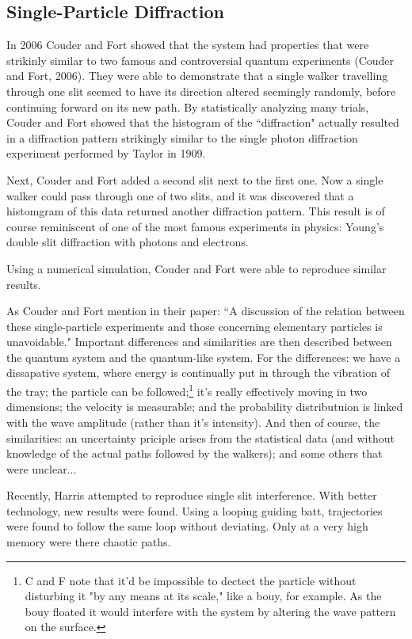              \subsection{Single-Particle Diffraction}
In 2006 Couder and Fort showed that the system had properties that were strikinly similar to two famous and controversial quantum experiments (Couder and Fort, 2006). They were able to demonstrate that a single walker travelling through one slit seemed to have its direction altered seemingly randomly, before continuing forward on its new path. By statistically analyzing many trials, Couder and Fort showed that the histogram of the ``diffraction" actually resulted in a diffraction pattern strikingly similar to the single photon diffraction experiment performed by Taylor in 1909. 

Next, Couder and Fort added a second slit next to the first one. Now a single walker could pass through  one of two slits, and it was discovered that a histomgram of this data returned another diffraction pattern. This result is of course reminiscent of one of the most famous experiments in physics: Young's double slit diffraction with photons and electrons. 
    
Using a numerical simulation, Couder and Fort were able to reproduce similar results. 
    
As Couder and Fort mention in their paper: ``A discussion of the relation between these single-particle experiments and those concerning elementary particles is unavoidable." Important differences and similarities are then described between the quantum system and the quantum-like system. For the differences: we have a dissapative system, where energy is continually put in through the vibration of the tray; the particle can be followed;\footnote{C and F note that it'd be impossible to dectect the particle without disturbing it "by any means at its scale," like a bouy, for example. As the bouy floated it would interfere with the system by altering the wave pattern on the surface.} it's really effectively moving in two dimensions; the velocity is measurable; and the probability distributuion is linked with the wave amplitude (rather than it's intensity). And then of course, the similarities: an uncertainty priciple arises from the statistical data (and without knowledge of the actual paths followed by the walkers); and some others that were unclear...

Recently, Harris attempted to reproduce single slit interference. With better technology, new results were found. Using a looping guiding batt, trajectories were found to follow the same loop without deviating. Only at a very high memory were there chaotic paths.


